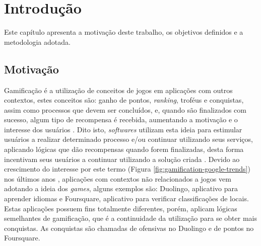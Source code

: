 \chapter[Introdução]{Introdução}
\par Este capítulo apresenta a motivação deste trabalho, os objetivos definidos e a metodologia adotada.

\section{Motivação}

\par Gamificação é a utilização de conceitos de jogos em aplicações com outros contextos, estes conceitos são: ganho de pontos, \textit{ranking}, troféus e conquistas, assim como processos que devem ser concluídos, e, quando são finalizados com sucesso, algum tipo de recompensa é recebida, aumentando a motivação e o interesse dos usuários \cite{robson2015all}. Dito isto, \textit{softwares} utilizam esta ideia para estimular usuários a realizar determinado processo e/ou continuar utilizando seus serviços, aplicando lógicas que dão recompensas quando forem finalizadas, desta forma incentivam seus usuários a continuar utilizando a solução criada \cite{hamari2014does}. Devido ao crescimento do interesse por este termo (Figura \ref{fig:gamification-google-trends}) nos últimos anos \cite{groh2012gamification}, aplicações com contextos não relacionados a jogos vem adotando a ideia dos \textit{games}, alguns exemplos são: Duolingo, aplicativo para aprender idiomas e Foursquare, aplicativo para verificar classificações de locais. Estas aplicações possuem fins totalmente diferentes, porém, aplicam lógicas semelhantes de gamificação, que é a continuidade da utilização para se obter mais conquistas. As conquistas são chamadas de ofensivas no Duolingo e de pontos no Foursquare.

